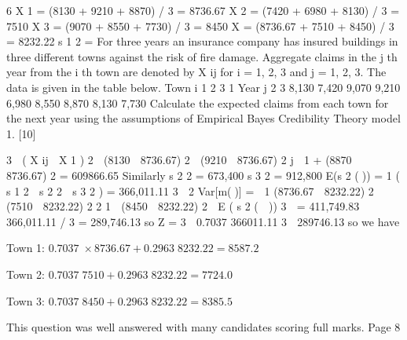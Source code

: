 \documentclass[a4paper,12pt]{article}
\begin{document}
6
X 1 = (8130 + 9210 + 8870) / 3 = 8736.67
X 2 = (7420 + 6980 + 8130) / 3 = 7510
X 3 = (9070 + 8550 + 7730) / 3 = 8450
X
= (8736.67 + 7510 + 8450) / 3 = 8232.22
s 1 2 =%
For three years an insurance company has insured buildings in three different towns
against the risk of fire damage. Aggregate claims in the j th year from the i th town are
denoted by X ij for i = 1, 2, 3 and j = 1, 2, 3. The data is given in the table below.
Town i
1
2
3
1 Year j
2 3
8,130
7,420
9,070 9,210
6,980
8,550 8,870
8,130
7,730
Calculate the expected claims from each town for the next year using the assumptions
of Empirical Bayes Credibility Theory model 1.
[10]


3
 ( X ij  X 1 ) 2  (8130  8736.67) 2  (9210  8736.67) 2
j  1
+ (8870  8736.67) 2 = 609866.65
Similarly s 2 2 = 673,400
s 3 2 = 912,800
E(s 2 ()) =
1
( s 1 2  s 2 2  s 3 2 ) = 366,011.11
3  2
Var[m()] =

1
(8736.67  8232.22) 2  (7510  8232.22) 2
2
1
 (8450  8232.22) 2  E ( s 2 (  ))
3

= 411,749.83  366,011.11 / 3
= 289,746.13
so Z =
3
 0.7037
366011.11
3 
289746.13
so we have

\begin{description}
\item{Town 1}: $0.7037 \times  8736.67 + 0.2963  8232.22 = 8587.2$
\item{Town 2}: $0.7037  7510
+ 0.2963  8232.22 = 7724.0$
\item{Town 3}: $0.7037  8450
+ 0.2963  8232.22 = 8385.5$
\end{description}

This question was well answered with many candidates scoring full marks.
Page 8%
\end{document}
